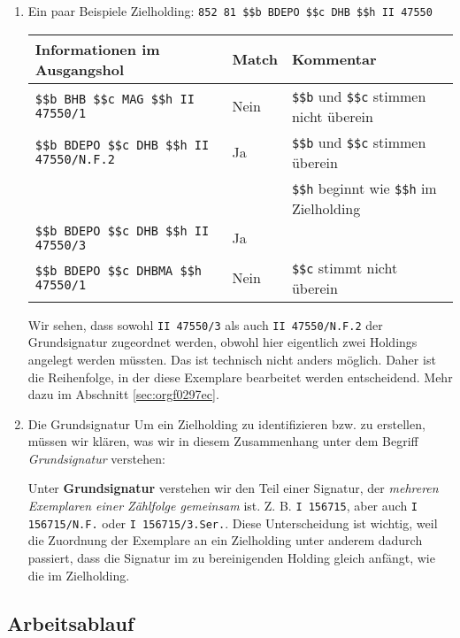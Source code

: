 \documentclass[10pt, a4paper]{scrartcl}
\begin{document}
\begin{enumerate}
\item Ein paar Beispiele
\label{sec:org6f9a054}
Zielholding: \texttt{852 81 \$\$b BDEPO \$\$c DHB \$\$h II 47550}

\begin{center}
\begin{tabular}{lll}
Informationen im Ausgangshol & Match & Kommentar\\
\hline
\texttt{\$\$b BHB \$\$c MAG \$\$h II 47550/1} & Nein & \texttt{\$\$b} und \texttt{\$\$c} stimmen nicht überein\\
\texttt{\$\$b BDEPO \$\$c DHB \$\$h II 47550/N.F.2} & Ja & \texttt{\$\$b} und \texttt{\$\$c} stimmen überein\\
 &  & \texttt{\$\$h} beginnt wie \texttt{\$\$h} im Zielholding\\
\texttt{\$\$b BDEPO \$\$c DHB \$\$h II 47550/3} & Ja & \\
\texttt{\$\$b BDEPO \$\$c DHBMA \$\$h 47550/1} & Nein & \texttt{\$\$c} stimmt nicht überein\\
\end{tabular}
\end{center}

Wir sehen, dass sowohl \texttt{II 47550/3} als auch \texttt{II 47550/N.F.2} der
Grundsignatur zugeordnet werden, obwohl hier eigentlich zwei Holdings
angelegt werden müssten. Das ist technisch nicht anders möglich. Daher
ist die Reihenfolge, in der diese Exemplare bearbeitet werden
entscheidend. Mehr dazu im Abschnitt \ref{sec:orgf0297ec}.



\item Die Grundsignatur
\label{sec:org9ca78c5}
Um ein Zielholding zu identifizieren bzw. zu erstellen, müssen wir klären,
was wir in diesem Zusammenhang unter dem Begriff \emph{Grundsignatur} verstehen:

Unter \textbf{Grundsignatur} verstehen wir den Teil einer Signatur, der \emph{mehreren
Exemplaren einer Zählfolge gemeinsam} ist. Z. B. \texttt{I 156715}, aber auch \texttt{I
        156715/N.F.} oder \texttt{I 156715/3.Ser.}. Diese Unterscheidung ist wichtig, weil
die Zuordnung der Exemplare an ein Zielholding unter anderem dadurch
passiert, dass die Signatur im zu bereinigenden Holding gleich anfängt, wie
die im Zielholding.
\end{enumerate}
\subsection{Arbeitsablauf}
\label{sec:org4c78e85}
\end{document}
